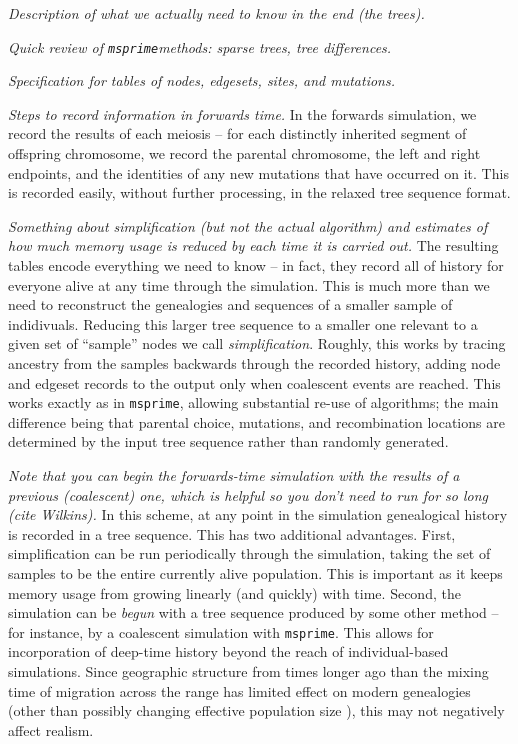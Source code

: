 \documentclass{article}
\newcommand{\msprime}{\texttt{msprime}}
\newcommand{\plr}[1]{{\em \color{blue} #1}}
\begin{document}
\plr{Description of what we actually need to know in the end (the trees).}

\plr{Quick review of \msprime methods: sparse trees, tree differences.}

\plr{Specification for tables of nodes, edgesets, sites, and mutations.}

\plr{Steps to record information in forwards time.}
In the forwards simulation,
we record the results of each meiosis --
for each distinctly inherited segment of offspring chromosome,
we record the parental chromosome,
the left and right endpoints,
and the identities of any new mutations that have occurred on it.
This is recorded easily, without further processing,
in the relaxed tree sequence format.

\plr{Something about simplification (but not the actual algorithm)
and estimates of how much memory usage is reduced by each time it is carried out.}
The resulting tables encode everything we need to know --
in fact, they record all of history for everyone alive at any time through the simulation.
This is much more than we need to reconstruct the genealogies and sequences
of a smaller sample of indidivuals.
Reducing this larger tree sequence to a smaller one relevant to a given set of ``sample'' nodes
we call \emph{simplification}.
Roughly, this works by tracing ancestry from the samples backwards through the recorded history,
adding node and edgeset records to the output only when coalescent events are reached.
This works exactly as in \msprime, allowing substantial re-use of algorithms;
the main difference being that parental choice, mutations, and recombination locations 
are determined by the input tree sequence
rather than randomly generated.

\plr{Note that you can begin the forwards-time simulation with the results of a previous (coalescent) one,
which is helpful so you don't need to run for so long (cite Wilkins).}
In this scheme,
at any point in the simulation genealogical history is recorded in a tree sequence.
This has two additional advantages.
First, simplification can be run periodically through the simulation,
taking the set of samples to be the entire currently alive population.
This is important as it keeps memory usage from growing linearly (and quickly) with time.
Second, the simulation can be \emph{begun} with a tree sequence produced by some other method --
for instance, by a coalescent simulation with \msprime.
This allows for incorporation of deep-time history beyond the reach of individual-based simulations.
Since geographic structure from times longer ago than the mixing time of migration across the range
has limited effect on modern genealogies \citep{wilkins_separation}
(other than possibly changing effective population size \citet{durretspatial}),
this may not negatively affect realism.
\end{document}
